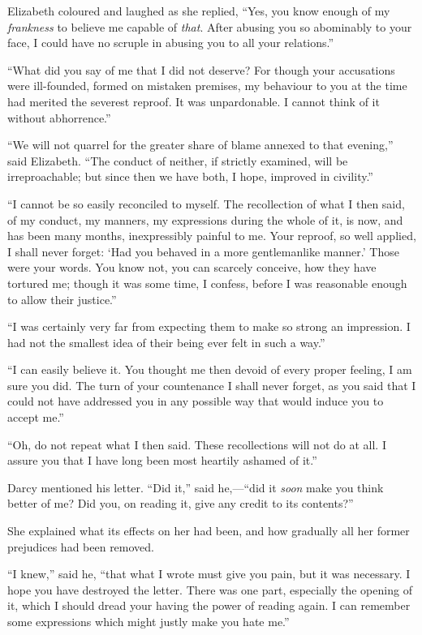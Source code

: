 \documentclass[12pt]{book}
\begin{document}
Elizabeth coloured and laughed as she replied, ``Yes, you know enough of my \textit{frankness} to believe me capable of \textit{that}. After abusing you so abominably to your face, I could have no scruple in abusing you to all your relations.''

``What did you say of me that I did not deserve? For though your accusations were ill-founded, formed on mistaken premises, my behaviour to you at the time had merited the severest reproof. It was unpardonable. I cannot think of it without abhorrence.''

``We will not quarrel for the greater share of blame annexed to that evening,'' said Elizabeth. ``The conduct of neither, if strictly examined, will be irreproachable; but since then we have both, I hope, improved in civility.''

``I cannot be so easily reconciled to myself. The recollection of what I then said, of my conduct, my manners, my expressions during the whole of it, is now, and has been many months, inexpressibly painful to me. Your reproof, so well applied, I shall never forget: `Had you behaved in a more gentlemanlike manner.' Those were your words. You know not, you can scarcely conceive, how they have tortured me; though it was some time, I confess, before I was reasonable enough to allow their justice.''

``I was certainly very far from expecting them to make so strong an impression. I had not the smallest idea of their being ever felt in such a way.''

``I can easily believe it. You thought me then devoid of every proper feeling, I am sure you did. The turn of your countenance I shall never forget, as you said that I could not have addressed you in any possible way that would induce you to accept me.''

``Oh, do not repeat what I then said. These recollections will not do at all. I assure you that I have long been most heartily ashamed of it.''

Darcy mentioned his letter. ``Did it,'' said he,---``did it \textit{soon} make you think better of me? Did you, on reading it, give any credit to its contents?''

She explained what its effects on her had been, and how gradually all her former prejudices had been removed.

``I knew,'' said he, ``that what I wrote must give you pain, but it was necessary. I hope you have destroyed the letter. There was one part, especially the opening of it, which I should dread your having the power of reading again. I can remember some expressions which might justly make you hate me.''
\end{document}
